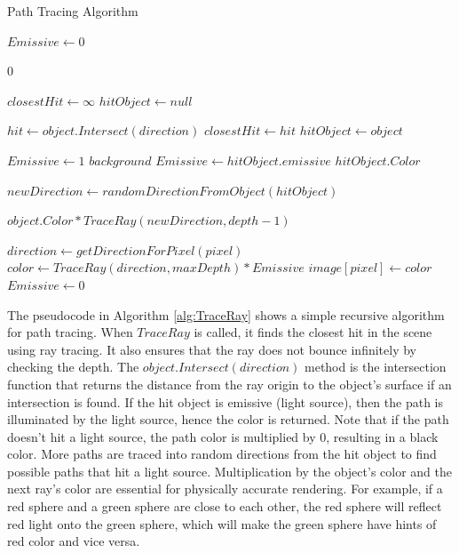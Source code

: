\documentclass[12pt]{article}
\begin{document}
\begin{algorithm}[H]
    \caption{Path Tracing Algorithm}
    \label{alg:TraceRay}
    \small
    \begin{algorithmic}[1]
        \State $Emissive \gets 0$

        \State \Return $0$ 
        \EndIf

        \State $closestHit \gets \infty$
        \State $hitObject \gets null$

        \State $hit \gets object.Intersect(direction)$
        \State $closestHit \gets hit$
        \State $hitObject \gets object$
        \EndIf
        \EndFor

        \State $Emissive \gets 1$ 
        \State \Return $background$
        \EndIf
        \State $Emissive \gets hitObject.emissive$
         
        \State \Return $hitObject.Color$
        \EndIf

        \State $newDirection \gets randomDirectionFromObject(hitObject)$ 

        \State \Return $object.Color * TraceRay(newDirection, depth - 1)$

        \EndProcedure

        \State $direction \gets getDirectionForPixel(pixel)$
        \State $color \gets TraceRay(direction, maxDepth) * Emissive$
        \State $image[pixel] \gets color$
        \State $Emissive \gets 0$ 
        \EndFor
    \end{algorithmic}
\end{algorithm}

The pseudocode in Algorithm \ref{alg:TraceRay} shows a simple recursive algorithm for path tracing.
When $TraceRay$ is called, it finds the closest hit in the scene using ray tracing.
It also ensures that the ray does not bounce infinitely by checking the depth.
The $object.Intersect(direction)$ method is the intersection function that returns the distance from the ray origin to the object's surface if an intersection is found.
If the hit object is emissive (light source), then the path is illuminated by the light source, hence the color is returned. Note that if the path doesn't hit a light source, the path color is multiplied by 0, resulting in a black color. More paths are traced into random directions from the hit object to find possible paths that hit a light source. Multiplication by the object's color and the next ray's color are essential for physically accurate rendering. For example, if a red sphere and a green sphere are close to each other, the red sphere will reflect red light onto the green sphere, which will make the green sphere have hints of red color and vice versa.
\end{document}
